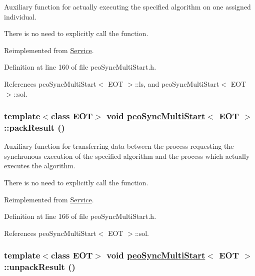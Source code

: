 Auxiliary function for actually executing the specified algorithm on one assigned individual. 

There is no need to explicitly call the function. 

Reimplemented from \hyperlink{classService_e4f2894e6121e60f38d41cfbd7447ae4}{Service}.

Definition at line 160 of file peo\-Sync\-Multi\-Start.h.

References peo\-Sync\-Multi\-Start$<$ EOT $>$::ls, and peo\-Sync\-Multi\-Start$<$ EOT $>$::sol.\hypertarget{classpeoSyncMultiStart_6c48eb0dae741cff7203b65e226f9616}{
\subsubsection[packResult]{\setlength{\rightskip}{0pt plus 5cm}template$<$class EOT$>$ void \hyperlink{classpeoSyncMultiStart}{peo\-Sync\-Multi\-Start}$<$ EOT $>$::pack\-Result ()}}
\label{classpeoSyncMultiStart_6c48eb0dae741cff7203b65e226f9616}


Auxiliary function for transferring data between the process requesting the synchronous execution of the specified algorithm and the process which actually executes the algorithm. 

There is no need to explicitly call the function. 

Reimplemented from \hyperlink{classService_e5e4f90b2315e15c2a2913bd370f4cf5}{Service}.

Definition at line 166 of file peo\-Sync\-Multi\-Start.h.

References peo\-Sync\-Multi\-Start$<$ EOT $>$::sol.\hypertarget{classpeoSyncMultiStart_c3cbd1f10a89d1915c5ccf82a2c34a1d}{
\subsubsection[unpackResult]{\setlength{\rightskip}{0pt plus 5cm}template$<$class EOT$>$ void \hyperlink{classpeoSyncMultiStart}{peo\-Sync\-Multi\-Start}$<$ EOT $>$::unpack\-Result ()}}
\label{classpeoSyncMultiStart_c3cbd1f10a89d1915c5ccf82a2c34a1d}


